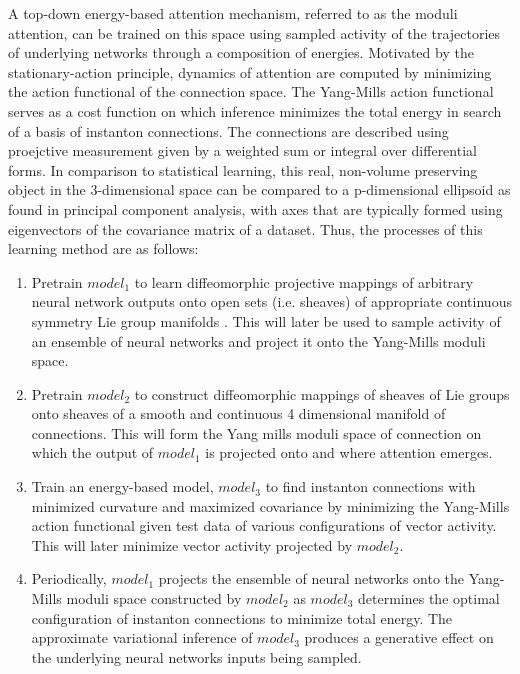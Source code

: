 \documentclass{article}
\begin{document}
A top-down energy-based attention mechanism, referred to as the moduli attention, can be trained on this space using sampled activity of the trajectories of underlying networks through a composition of energies. Motivated by the stationary-action principle, dynamics of attention are computed by minimizing the action functional of the connection space. The Yang-Mills action functional serves as a cost function on which inference minimizes the total energy in search of a basis of instanton connections. The connections are described using proejctive measurement given by a weighted sum or integral over differential forms. In comparison to statistical learning, this real, non-volume preserving object in the 3-dimensional space can be compared to a p-dimensional ellipsoid as found in principal component analysis, with axes that are typically formed using eigenvectors of the covariance matrix of a dataset. Thus, the processes of this learning method are as follows: 
\begin{enumerate}
    \item Pretrain $model_1$ to learn diffeomorphic projective mappings of arbitrary neural network outputs onto open sets (i.e. sheaves) of appropriate continuous symmetry Lie group manifolds . This will later be used to sample activity of an ensemble of neural networks and project it onto the Yang-Mills moduli space.
    \item Pretrain $model_2$ to construct diffeomorphic mappings of sheaves of Lie groups onto sheaves of a smooth and continuous 4 dimensional manifold of connections. This will form the Yang mills moduli space of connection on which the output of $model_1$ is projected onto and where attention emerges.
    \item Train an energy-based model, $model_3$ to find instanton connections with minimized curvature and maximized covariance by minimizing the Yang-Mills action functional given test data of various configurations of vector activity. This will later minimize vector activity projected by $model_2$.
    \item Periodically, $model_1$ projects the ensemble of neural networks onto the Yang-Mills moduli space constructed by $model_2$ as $model_3$ determines the optimal configuration of instanton connections to minimize total energy. The approximate variational inference of $model_3$ produces a generative effect on the underlying neural networks inputs being sampled.
\end{enumerate}

\end{document}
